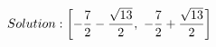 \documentclass[preview]{standalone}
\begin{document}
\begin{align*}
\special{dvisvgm:raw <g id='unique000'>}Solution: \left[ - \frac{7}{2} - \frac{\sqrt{13}}{2}, \  - \frac{7}{2} + \frac{\sqrt{13}}{2}\right]\special{dvisvgm:raw </g>}
\end{align*}
\end{document}
